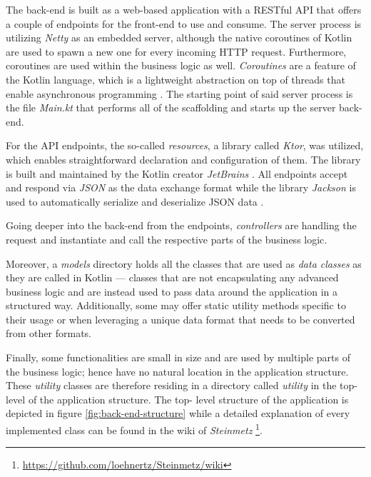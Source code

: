 \documentclass[12pt,a4paper]{report}
\begin{document}
The back-end is built as a web-based application with a RESTful API that offers
a couple of endpoints for the front-end to use and consume. The server process
is utilizing \textit{Netty} \cite{ktor-netty} as an embedded server, although
the native coroutines of Kotlin are used to spawn a new one for every incoming
HTTP request. Furthermore, coroutines are used within the business logic as
well. \textit{Coroutines} are a feature of the Kotlin language, which is a
lightweight abstraction on top of threads that enable asynchronous programming
\cite{kotlin-coroutines}. The starting point of said server process is the file
\textit{Main.kt} that performs all of the scaffolding and starts up the server
back-end.

For the API endpoints, the so-called \textit{resources}, a library called
\textit{Ktor}, was utilized, which enables straightforward declaration and
configuration of them. The library is built and maintained by the Kotlin
creator \textit{JetBrains} \cite{ktor}. All endpoints accept and respond via
\textit{JSON} as the data exchange format while the library \textit{Jackson} is
used to automatically serialize and deserialize JSON data \cite{ktor-jackson}.

Going deeper into the back-end from the endpoints, \textit{controllers} are
handling the request and instantiate and call the respective parts of the
business logic.

Moreover, a \textit{models} directory holds all the classes that are used as
\textit{data classes} as they are called in Kotlin --- classes that are not
encapsulating any advanced business logic and are instead used to pass data
around the application in a structured way. Additionally, some may offer static
utility methods specific to their usage or when leveraging a unique data format
that needs to be converted from other formats.

Finally, some functionalities are small in size and are used by multiple parts
of the business logic; hence have no natural location in the application
structure. These \textit{utility} classes are therefore residing in a directory
called \textit{utility} in the top-level of the application structure. The top-
level structure of the application is depicted in figure
\ref{fig:back-end-structure} while a detailed explanation of every implemented
class can be found in the wiki of \textit{Steinmetz}
\footnote{\url{https://github.com/loehnertz/Steinmetz/wiki}}.
\end{document}
